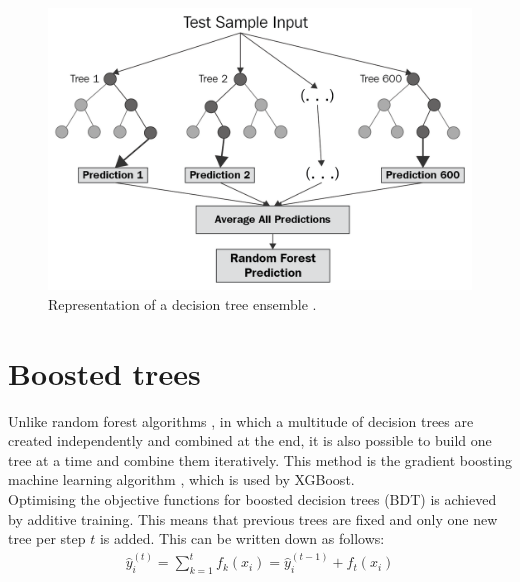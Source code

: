\begin{figure}
  \centering
  \includegraphics[height=0.6\textwidth]{images/random_forest.png}
  \caption{Representation of a decision tree ensemble \cite{random_forest}.}
  \label{fig:random_forest}
\end{figure}

\section{Boosted trees}
Unlike random forest algorithms \cite{random}, in which a multitude of decision trees are created independently and combined at the end,
it is also possible to build one tree at a time and
combine them iteratively. This method is the gradient boosting machine learning algorithm \cite{gradient}, which is used by XGBoost. \\
Optimising the objective functions for
boosted decision trees (BDT) is achieved by additive training. This means that previous trees are fixed and only one new tree per step $t$ is added.
This can be written
down as follows:
\begin{align}
  \hat{y}_i^{(t)} = \sum_{k=1}^t f_k(x_i) = \hat{y}_i^{(t-1)} + f_t(x_i)
\end{align}

